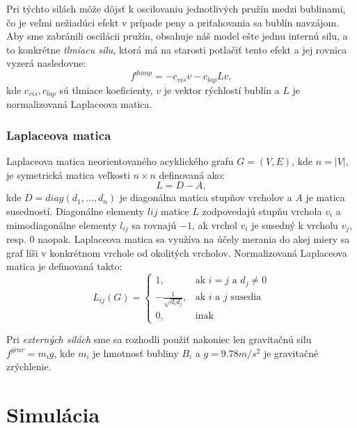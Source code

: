 Pri týchto silách môže dôjsť k oscilovaniu jednotlivých pružín medzi bublinami, čo je veľmi nežiadúci efekt v prípade peny a priťahovania sa bublín navzájom. Aby sme zabránili oscilácii pružín, obsahuje náš model ešte jednu internú silu, a to konkrétne \textit{tlmiacu silu}, ktorá má na starosti potlačiť tento efekt a jej rovnica vyzerá nasledovne:
\begin{equation}
	\label{eq:spring_system_damping_force}
	f^{damp} = -c_{vis}v - c_{lap}Lv,
\end{equation}
kde $c_{vis}, c_{lap}$ sú tlmiace koeficienty, $v$ je vektor rýchlostí bublín a $L$ je normalizovaná Laplaceova matica.

\subsubsection{Laplaceova matica}

Laplaceova matica neorientovaného acyklického grafu $G = (V, E)$, kde $n = \left | V \right |$, je symetrická matica veľkosti $n \times n$ definovaná ako:
\begin{equation}
	\label{eq:laplacian_matrix}
	L = D - A,
\end{equation}
kde $D = diag(d_{1}, ..., d_{n})$ je diagonálna matica stupňov vrcholov a $A$ je matica susedností. Diagonálne elementy $l{ij}$ matice $L$ zodpovedajú stupňu vrchola $v_{i}$ a mimodiagonálne elementy $l_{ij}$ sa rovnajú $-1$, ak vrchol $v_{i}$ je susedný k vrcholu $v_{j}$, resp. $0$ naopak. Laplaceova matica sa využíva na účely merania do akej miery sa graf líši v konkrétnom vrchole od okolitých vrcholov. \newline
Normalizovaná Laplaceova matica je definovaná takto:
\begin{equation}
	\label{eq:normalized_laplacian_matrix}
	L_{ij}(G) = \left\{\begin{matrix}
	1, & \textrm{ak }i = j\textrm{ a }d_{j} \neq 0\\ 
	-\frac{1}{\sqrt{d_{i}d_{j}}}, & \textrm{ak } i \textrm{ a } j \textrm{ susedia}\\ 
	0, & \textrm{inak}
	\end{matrix}\right.
\end{equation}

Pri \textit{externých silách} sme sa rozhodli použiť nakoniec len gravitačnú silu $f^{grav} = m_{i}g$, kde $m_{i}$ je hmotnosť bubliny $B_{i}$ a $g = 9.78 m/s^{2}$ je gravitačné zrýchlenie.

\section{Simulácia}

